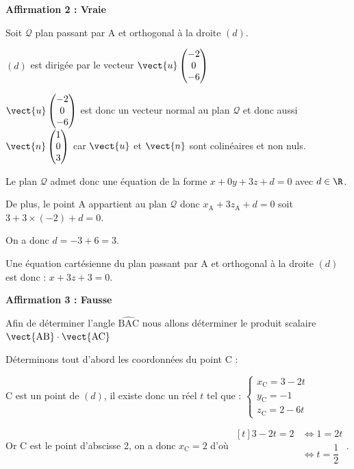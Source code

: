 \bigskip

\textbf{Affirmation 2 : Vraie}

Soit $\mathcal{Q}$  plan passant par A et orthogonal à la droite $(d)$.

$(d)$ est dirigée par le vecteur $\vect{u}\begin{pmatrix}-2\\0\\-6\end{pmatrix}$

$\vect{u}\begin{pmatrix}-2\\0\\-6\end{pmatrix}$ est donc un vecteur normal au plan $\mathcal{Q}$  et donc aussi $\vect{n} \begin{pmatrix} 1\\0\\3 \end{pmatrix}$ car $\vect{u}$ et $\vect{n}$ sont colinéaires et non nuls.

Le plan $\mathcal{Q}$ admet donc une équation de la forme $x+ 0y + 3z + d = 0$ avec $d \in \R$. 

De plus, le point A appartient au plan $\mathcal{Q}$ donc $x_{\mathrm{A}}+3z_{\mathrm{A}}+d=0$ soit $3 +3\times (-2) +d=0$.

On a donc $d = -3 + 6 = 3$.

Une équation cartésienne du plan passant par A et orthogonal à la droite $(d)$  est donc : $x+3 z+3=0$.

\bigskip

\textbf{Affirmation 3 : Fausse}

Afin de déterminer l'angle $\widehat{\mathrm{BAC}}$ nous allons déterminer le produit scalaire $\vect {\mathrm{AB}} \cdot \vect {\mathrm{AC}}$

Déterminons tout d'abord les coordonnées du point C :

C est un point de $(d)$, il existe donc un réel $t$ tel que  : $\left\{\begin{array}{l}
x_{\mathrm{C}}=3-2t \\
y_{\mathrm{C}}=-1 \\
z_{\mathrm{C}}=2-6t
\end{array} \right.$

Or C est le point d'abscisse 2, on  a donc $x_{\mathrm{C}}=2$ d'où  $\begin{aligned}[t] 3-2t=2 & \iff 1= 2t \\ & \iff t=\dfrac12\end{aligned}$.

